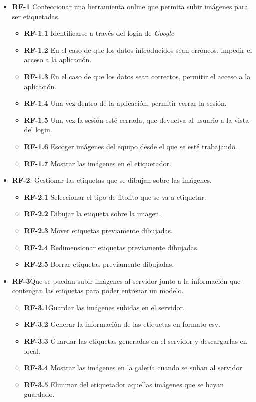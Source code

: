 \begin{itemize}
	\item \textbf{RF-1} Confeccionar una herramienta online que permita subir imágenes para ser etiquetadas.
	\begin{itemize}
		\item \textbf{RF-1.1}  Identificarse a través del login de \textit{Google}
		 	\item \textbf{RF-1.2} En el caso de que los datos introducidos sean erróneos, impedir el acceso a la aplicación. 
		 \item \textbf{RF-1.3} En el caso de que los datos sean correctos, permitir el acceso a la aplicación. 
		 \item \textbf{RF-1.4} Una vez dentro de la aplicación, permitir cerrar la sesión.
		 \item \textbf{RF-1.5} Una vez la sesión esté cerrada, que devuelva al usuario a la vista del login.
		\item \textbf{RF-1.6} Escoger imágenes del equipo desde el que se esté trabajando.
		\item \textbf{RF-1.7} Mostrar las imágenes en el etiquetador.
	\end{itemize}
	\item \textbf{RF-2}: Gestionar las etiquetas que se dibujan sobre las imágenes.
	\begin{itemize}
		\item \textbf{RF-2.1} Seleccionar el tipo de fitolito que se va a etiquetar.
		\item \textbf{RF-2.2} Dibujar la etiqueta sobre la imagen.
		\item \textbf{RF-2.3} Mover etiquetas previamente dibujadas.
		\item \textbf{RF-2.4} Redimensionar etiquetas previamente dibujadas.
		\item \textbf{RF-2.5} Borrar etiquetas previamente dibujadas.
	\end{itemize}
	\item \textbf{RF-3}Que se puedan subir imágenes al servidor junto a la información que contengan las etiquetas para poder entrenar un modelo. 
	\begin{itemize}
		\item \textbf{RF-3.1}Guardar las imágenes subidas en el servidor.
			\item \textbf{RF-3.2} Generar la información de las etiquetas en formato csv.
		\item \textbf{RF-3.3} Guardar las etiquetas generadas en el servidor y descargarlas en local.
		\item \textbf{RF-3.4} Mostrar las imágenes en la galería cuando se suban al servidor.
		\item \textbf{RF-3.5} Eliminar del etiquetador aquellas imágenes que se hayan guardado. 
	\end{itemize}

\end{itemize}
